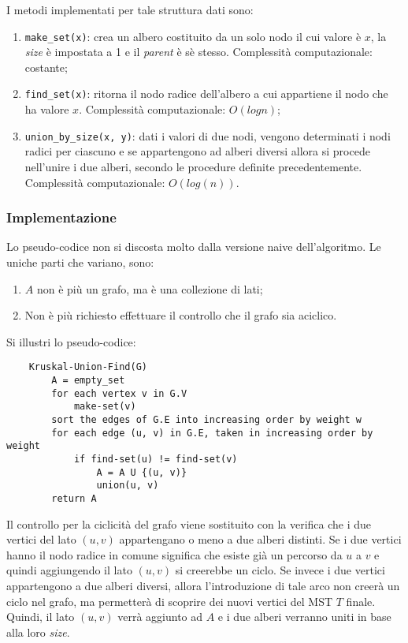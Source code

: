I metodi implementati per tale struttura dati sono:
\begin{enumerate}
    \item \verb|make_set(x)|: crea un albero costituito da un solo nodo
    il cui valore è $x$, la \textit{size} è impostata a 1 e il
    \textit{parent} è sè stesso. Complessità computazionale: costante;
    \item \verb|find_set(x)|: ritorna il nodo radice dell'albero a cui
    appartiene il nodo che ha valore $x$. Complessità computazionale:
    $O(log n)$;
    \item \verb|union_by_size(x, y)|: dati i valori di due nodi, vengono
    determinati i nodi radici per ciascuno e se appartengono ad alberi diversi
    allora si procede nell'unire i due alberi, secondo le procedure definite
    precedentemente. Complessità computazionale: $O(log(n))$.
\end{enumerate}

\subsubsection{Implementazione}

Lo pseudo-codice non si discosta molto dalla versione naive dell'algoritmo.
Le uniche parti che variano, sono:
\begin{enumerate}
    \item $A$ non è più un grafo, ma è una collezione di lati;
    \item Non è più richiesto effettuare il controllo che il grafo sia
    aciclico.
\end{enumerate}

Si illustri lo pseudo-codice:
\begin{verbatim}
    Kruskal-Union-Find(G)
        A = empty_set
        for each vertex v in G.V
            make-set(v)
        sort the edges of G.E into increasing order by weight w
        for each edge (u, v) in G.E, taken in increasing order by weight
            if find-set(u) != find-set(v)
                A = A U {(u, v)}
                union(u, v)
        return A
\end{verbatim}

Il controllo per la ciclicità del grafo viene sostituito con la verifica
che i due vertici del lato $(u, v)$ appartengano o meno a due alberi
distinti. Se i due vertici hanno il nodo radice in comune significa che
esiste già un percorso da $u$ a $v$ e quindi aggiungendo il lato $(u, v)$
si creerebbe un ciclo. Se invece i due vertici appartengono a due
alberi diversi, allora l'introduzione di tale arco non creerà un
ciclo nel grafo, ma permetterà di scoprire dei nuovi vertici del MST
$T$ finale. Quindi, il lato $(u, v)$ verrà aggiunto ad $A$ e i due
alberi verranno uniti in base alla loro \textit{size}.


